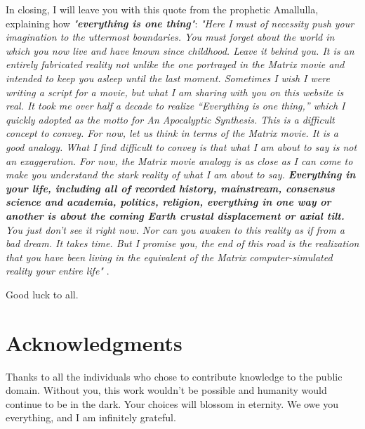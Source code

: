 \documentclass[10pt,twocolumn,letterpaper]{article}
\begin{document}
In closing, I will leave you with this quote from the prophetic Amallulla, explaining how \textit{"\textbf{everything is one thing}"}: \textit{"Here I must of necessity push your imagination to the uttermost boundaries. You must forget about the world in which you now live and have known since childhood. Leave it behind you. It is an entirely fabricated reality not unlike the one portrayed in the Matrix movie and intended to keep you asleep until the last moment. Sometimes I wish I were writing a script for a movie, but what I am sharing with you on this website is real. It took me over half a decade to realize “Everything is one thing,” which I quickly adopted as the motto for An Apocalyptic Synthesis. This is a difficult concept to convey. For now, let us think in terms of the Matrix movie. It is a good analogy. What I find difficult to convey is that what I am about to say is not an exaggeration. For now, the Matrix movie analogy is as close as I can come to make you understand the stark reality of what I am about to say. \textbf{Everything in your life, including all of recorded history, mainstream, consensus science and academia, politics, religion, everything in one way or another is about the coming Earth crustal displacement or axial tilt.} You just don’t see it right now. Nor can you awaken to this reality as if from a bad dream. It takes time. But I promise you, the end of this road is the realization that you have been living in the equivalent of the Matrix computer-simulated reality your entire life"} \cite{33,34}.

Good luck to all.

\section{Acknowledgments}

Thanks to all the individuals who chose to contribute knowledge to the public domain. Without you, this work wouldn't be possible and humanity would continue to be in the dark. Your choices will blossom in eternity. We owe you everything, and I am infinitely grateful.

\clearpage
\twocolumn

{\small
\renewcommand{\refname}{References}


}
\end{document}
